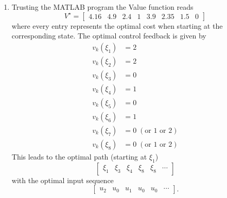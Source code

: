 \documentclass[12pt,pdftex,a4paper]{scrartcl}
\begin{document}
\begin{enumerate}
	\item Trusting the MATLAB program the Value function reads
	\begin{equation*}
		V^\star =
		\begin{bmatrix}
			4.16 & 4.9 & 2.4 & 1 & 3.9 & 2.35 & 1.5 & 0 
		\end{bmatrix}
	\end{equation*}
	where every entry represents the optimal cost when starting at the corresponding state.	
	The optimal control feedback is given by
	\begin{align*}
		v_k(\xi_1) &= 2 \\
		v_k(\xi_2) &= 2 \\
		v_k(\xi_3) &= 0 \\
		v_k(\xi_4) &= 1 \\
		v_k(\xi_5) &= 0 \\
		v_k(\xi_6) &= 1 \\
		v_k(\xi_7) &= 0 \; (\text{or } 1 \text{ or } 2)\\
		v_k(\xi_8) &= 0 \; (\text{or } 1 \text{ or } 2)
	\end{align*}
	This leads to the optimal path (starting at $\xi_1$)
	\begin{equation*}
		\begin{bmatrix}
			\xi_1 & \xi_3 & \xi_4 & \xi_8 & \xi_8 & \cdots
		\end{bmatrix}
	\end{equation*}
	with the optimal input sequence
	\begin{equation*}
		\begin{bmatrix}
			u_2 & u_0 & u_1 & u_0 & u_0 & \cdots
		\end{bmatrix}.
	\end{equation*}	
	

\end{enumerate}
\end{document}
